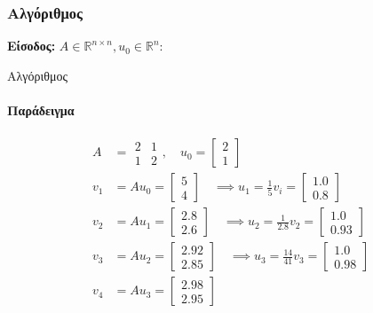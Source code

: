 \documentclass[11pt,a4paper,notitlepage,fleqn]{article}
\begin{document}
    \subsubsection{Αλγόριθμος}
    \textbf{Είσοδος:} \( A \in \mathbb R^{n\times n},
    u_0 \in \mathbb R^n \):
    
    \begin{algorithm}[H]
    	\caption{Αλγόριθμος}
\end{algorithm}

\paragraph{Παράδειγμα}
\begin{align*}
A&= \begin{matrix}
2&1\\1&2
\end{matrix},\quad u_0=\left[\begin{matrix}
2\\1
\end{matrix}\right] \\
v_1 &= Au_0 = \left[\begin{matrix}
5\\4
\end{matrix}\right] \quad \implies u_1 = \frac{1}{5}v_i = \left[
\begin{matrix}
1.0\\0.8
\end{matrix}\right] \\
v_2 &= Au_1 = \left[\begin{matrix}
2.8\\2.6
\end{matrix}\right] \quad \implies u_2 = \frac{1}{2.8}v_2 = \left[\begin{matrix}
1.0\\0.93
\end{matrix}\right] \\
v_3 &= Au_2 = \left[\begin{matrix}
2.92\\2.85
\end{matrix}\right] \quad \implies u_3 = \frac{14}{41} v_3 = \left[\begin{matrix}
1.0\\0.98
\end{matrix}\right] \\
v_4 &= Au_3 = \left[\begin{matrix}
2.98\\2.95
\end{matrix}\right]
\end{align*}
\end{document}
